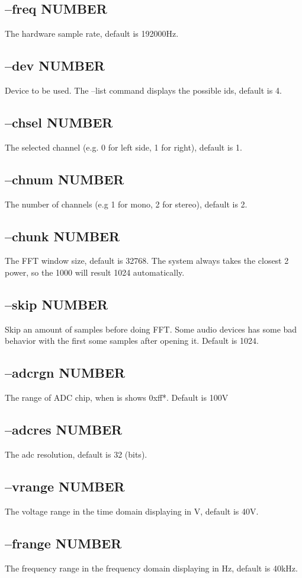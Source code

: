 \documentclass[10pt,a4paper]{article}
\begin{document}
\subsection{--freq NUMBER}
The hardware sample rate, default is 192000Hz.
\subsection{--dev NUMBER}
Device to be used. The --list command displays the possible ids, default is 4. 
\subsection{--chsel NUMBER}
The selected channel (e.g. 0 for left side, 1 for right), default is 1.
\subsection{--chnum NUMBER}
The number of channels (e.g 1 for mono, 2 for stereo), default is 2.
\subsection{--chunk NUMBER}
The FFT window size, default is 32768. The system always takes the closest 2 power, so the 1000 will result 1024 automatically.
\subsection{--skip NUMBER}
Skip an amount of samples before doing FFT. Some audio devices has some bad behavior with the first some samples after opening it. Default is 1024.
\subsection{--adcrgn NUMBER}
The range of ADC chip, when is shows 0xff*. Default is 100V
\subsection{--adcres NUMBER}
The adc resolution, default is 32 (bits).
\subsection{--vrange NUMBER}
The voltage range in the time domain displaying in V, default is 40V.
\subsection{--frange NUMBER}
The frequency range in the frequency domain displaying in Hz, default is 40kHz. 
\end{document}
